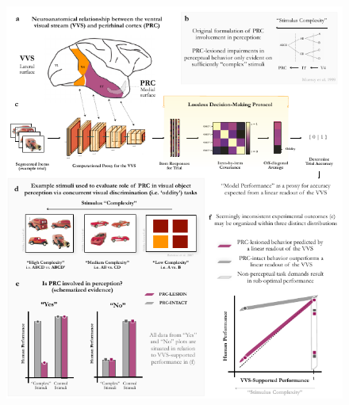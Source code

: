 \documentclass[11pt]{article}
\begin{document}
\begin{figure}[ht] 
\centering
\includegraphics[width=.8\linewidth]{figures/INTRO}

\end{figure}
\end{document}
